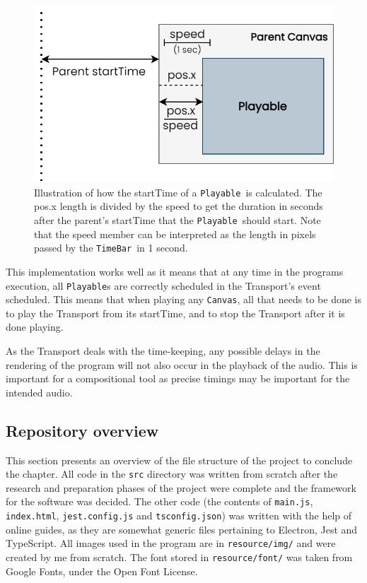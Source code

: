 \documentclass[12pt,a4paper,oneside,openright]{report}
\newcommand{\canvas}{\texttt{Canvas}}
\newcommand{\timebar}{\texttt{TimeBar}}
\newcommand{\playable}{\texttt{Playable}}
\begin{document}
\begin{figure}[h]
    \centering
    \includegraphics[scale=0.5]{images/startTime_calculation.png}
    \caption{Illustration of how the startTime of a \playable\ is calculated. The pos.x length is divided by the speed to get the duration in seconds after the parent's startTime that the \playable\ should start. Note that the speed member can be interpreted as the length in pixels passed by the \timebar\ in 1 second.}
    \label{fig:start_calc}
\end{figure}

This implementation works well as it means that at any time in the programs execution, all \playable s are correctly scheduled in the Transport's event scheduled. This means that when playing any \canvas, all that needs to be done is to play the Transport from its startTime, and to stop the Transport after it is done playing.

As the Transport deals with the time-keeping, any possible delays in the rendering of the program will not also occur in the playback of the audio. This is important for a compositional tool as precise timings may be important for the intended audio.

\clearpage
\subsection{Repository overview}
This section presents an overview of the file structure of the project to conclude the chapter. All code in the \verb|src| directory was written from scratch after the research and preparation phases of the project were complete and the framework for the software was decided. The other code (the contents of \verb|main.js|, \verb|index.html|, \verb|jest.config.js| and \verb|tsconfig.json|) was written with the help of online guides, as they are somewhat generic files pertaining to Electron, Jest and TypeScript. All images used in the program are in \verb|resource/img/| and were created by me from scratch. The font stored in \verb|resource/font/| was taken from Google Fonts, under the Open Font License.
\end{document}

